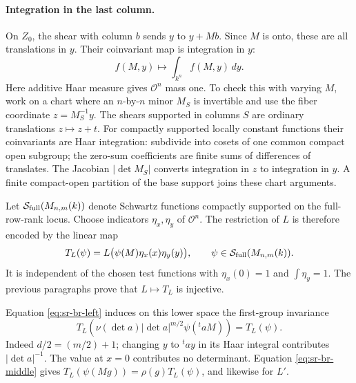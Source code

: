 \paragraph{Integration in the last column.}
On \(Z_0\), the shear with column \(b\) sends \(y\) to \(y+Mb\).
Since \(M\) is onto, these are all translations in \(y\).
Their coinvariant map is integration in \(y\):
\[
                f(M,y)\longmapsto\int_{k^n}f(M,y)\,dy .
\]
Here additive Haar measure gives \(\mathcal O^n\) mass one.
To check this with varying \(M\), work on a chart where an
\(n\)-by-\(n\) minor \(M_S\) is invertible and use the fiber
coordinate \(z=M_S^{-1}y\).  The shears supported in columns
\(S\) are ordinary translations \(z\mapsto z+t\).
For compactly supported locally constant functions their
coinvariants are Haar integration: subdivide into cosets of
one common compact open subgroup; the zero-sum coefficients
are finite sums of differences of translates.
The Jacobian \(|\det M_S|\) converts integration in \(z\) to
integration in \(y\).  A finite compact-open partition of the
base support joins these chart arguments.

Let
\(\mathcal S_{\rm full}(M_{n,m}(k))\) denote Schwartz functions
compactly supported on the full-row-rank locus.
Choose indicators \(\eta_x,\eta_y\) of \(\mathcal O^n\).
The restriction of \(L\) is therefore encoded by the linear map
\[
 T_L(\psi)
       =L\bigl(\psi(M)\eta_x(x)\eta_y(y)\bigr),
       \qquad \psi\in\mathcal S_{\rm full}(M_{n,m}(k)).
\]
It is independent of the chosen test functions with
\(\eta_x(0)=1\) and \(\int\eta_y=1\).  The previous paragraphs
prove that \(L\mapsto T_L\) is injective.

Equation \eqref{eq:sr-br-left} induces on this lower space
the first-group invariance
\begin{equation}
 T_L\!\left(\nu(\det a)|\det a|^{m/2}
                           \psi({}^taM)\right)=T_L(\psi).
 \label{eq:sr-br-lower-action}
\end{equation}
Indeed \(d/2=(m/2)+1\); changing \(y\) to \({}^ta y\)
in its Haar integral contributes \(|\det a|^{-1}\).
The value at \(x=0\) contributes no determinant.
Equation \eqref{eq:sr-br-middle} gives
\(T_L(\psi(Mg))=\rho(g)T_L(\psi)\), and likewise for \(L'\).

